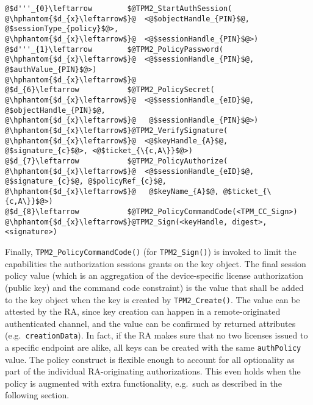 \documentclass{sig-alternate-2013}
\begin{document}
\begin{lstlisting}[float=tb,label={lst:pin-entry},
caption={PIN entry policy fragment}]
@$d'''_{0}\leftarrow        $@TPM2_StartAuthSession(
@\hphantom{$d_{x}\leftarrow$}@  <@$objectHandle_{PIN}$@, @$sessionType_{policy}$@>,
@\hphantom{$d_{x}\leftarrow$}@  <@$sessionHandle_{PIN}$@>)
@$d'''_{1}\leftarrow        $@TPM2_PolicyPassword(
@\hphantom{$d_{x}\leftarrow$}@  <@$sessionHandle_{PIN}$@, @$authValue_{PIN}$@>)
@\hphantom{$d_{x}\leftarrow$}@
@$d_{6}\leftarrow           $@TPM2_PolicySecret(
@\hphantom{$d_{x}\leftarrow$}@  <@$sessionHandle_{eID}$@, @$objectHandle_{PIN}$@,
@\hphantom{$d_{x}\leftarrow$}@   @$sessionHandle_{PIN}$@>)
@\hphantom{$d_{x}\leftarrow$}@TPM2_VerifySignature(
@\hphantom{$d_{x}\leftarrow$}@  <@$keyHandle_{A}$@, @$signature_{c}$@>, <@$ticket_{\{c,A\}}$@>)
@$d_{7}\leftarrow           $@TPM2_PolicyAuthorize(
@\hphantom{$d_{x}\leftarrow$}@  <@$sessionHandle_{eID}$@, @$signature_{c}$@, @$policyRef_{c}$@,
@\hphantom{$d_{x}\leftarrow$}@   @$keyName_{A}$@, @$ticket_{\{c,A\}}$@>)
@$d_{8}\leftarrow           $@TPM2_PolicyCommandCode(<TPM_CC_Sign>)
@\hphantom{$d_{x}\leftarrow$}@TPM2_Sign(<keyHandle, digest>, <signature>)
\end{lstlisting}


Finally, \texttt{TPM2\_PolicyCommandCode()} (for \texttt{TPM2\_Sign()}) is
invoked to limit the capabilities the authorization sessions grants on the key
object. The final session policy value (which is an aggregation of the
device-specific license authorization (public key) and the command code
constraint) is the value that shall be added to the key object when the key is
created by \texttt{TPM2\_Create()}. The value can be attested by the RA, since
key creation can happen in a remote-originated authenticated channel, and the
value can be confirmed by returned attributes (e.g.\ \texttt{creationData}). In
fact, if the RA makes sure that no two licenses issued to a specific endpoint
are alike, all keys can be created with the same \texttt{authPolicy} value. The
policy construct is flexible enough to account for all optionality as part of
the individual RA-originating authorizations. This even holds when the policy is
augmented with extra functionality, e.g.\ such as described in the following
section.
\end{document}
